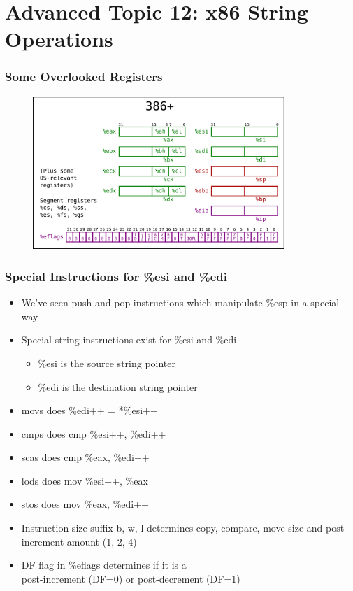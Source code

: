 \documentclass[11pt,xcolor=dvipsnames]{beamer}
\newcommand{\vs}{\vspace{0.5em}}
\newcommand{\mvs}{\vspace{-0.95em}}
\begin{document}
\section{Advanced Topic 12: x86 String Operations}

\begin{frame}[fragile,t]
\frametitle{Some Overlooked Registers}
\begin{figure}
\centering \includegraphics[width=0.85\textwidth]{figures/386state.png}
\end{figure}
\end{frame}

\begin{frame}[fragile,t]
\mvs
\frametitle{Special Instructions for {\ttfamily \%esi} and {\ttfamily \%edi}}
\begin{itemize}
  \item We've seen {\ttfamily push} and {\ttfamily pop} instructions which manipulate {\ttfamily \%esp} in a special way
  \item Special string instructions exist for {\ttfamily \%esi} and {\ttfamily \%edi}
  \begin{itemize}
    \item {\ttfamily \%esi} is the source string pointer
    \item {\ttfamily \%edi} is the destination string pointer
  \end{itemize}
  \pause
  \item {\ttfamily movs} does {\ttfamily *\%edi++ = *\%esi++}
  \item {\ttfamily cmps} does {\ttfamily cmp \%esi++, \%edi++}
  \item {\ttfamily scas} does {\ttfamily cmp \%eax, \%edi++}
  \item {\ttfamily lods} does {\ttfamily mov \%esi++, \%eax}
  \item {\ttfamily stos} does {\ttfamily mov \%eax, \%edi++}
  \pause
  \vs
  \item Instruction size suffix {\ttfamily b, w, l} determines copy, compare, move size and post-increment amount (1, 2, 4)
  \item DF flag in {\ttfamily \%eflags} determines if it is a \\ post-increment (DF=0) or post-decrement (DF=1)
\end{itemize}
\end{frame}
\end{document}

